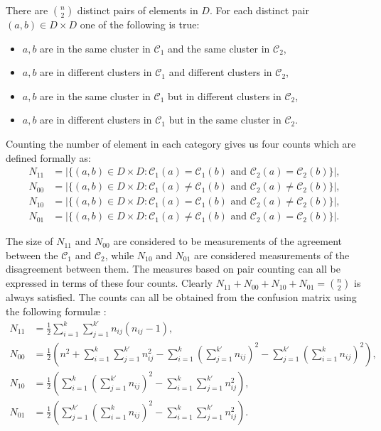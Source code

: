 \documentclass[a4paper]{report}
\newcommand{\dset}{D}
\newcommand{\clus}{\mathcal{C}}
\begin{document}
There are $\binom{n}{2}$ distinct pairs of elements in $\dset$.  For each
distinct pair $(a,b) \in \dset \times \dset$ one of the following is true:
\begin{itemize}
\item $a,b$ are in the same cluster in $\clus_1$ and the same cluster in
  $\clus_2$,
\item $a,b$ are in different clusters in $\clus_1$ and different clusters in
  $\clus_2$,
\item $a,b$ are in the same cluster in $\clus_1$ but in different clusters in
  $\clus_2$,
\item $a,b$ are in different clusters in $\clus_1$ but in the same cluster in
  $\clus_2$.
\end{itemize}

Counting the number of element in each category gives us four counts which are
defined formally as:
\begin{align*}
  N_{11} &= |\{(a,b) \in \dset \times \dset \colon
              \clus_1(a)=\clus_1(b) \text{ and } \clus_2(a)=\clus_2(b)
            \}|, \\
  N_{00} &= |\{(a,b) \in \dset \times \dset \colon
              \clus_1(a)\neq\clus_1(b) \text{ and } \clus_2(a)\neq\clus_2(b)
            \}|, \\
  N_{10} &= |\{(a,b) \in \dset \times \dset \colon
              \clus_1(a)=\clus_1(b) \text{ and } \clus_2(a)\neq\clus_2(b)
            \}|, \\
  N_{01} &= |\{(a,b) \in \dset \times \dset \colon
              \clus_1(a)\neq\clus_1(b) \text{ and } \clus_2(a)=\clus_2(b)
            \}|.
\end{align*}

The size of $N_{11}$ and $N_{00}$ are considered to be measurements of the
agreement between the $\clus_1$ and $\clus_2$, while $N_{10}$ and $N_{01}$ are
considered measurements of the disagreement between them.  The measures based
on pair counting can all be expressed in terms of these four counts.  Clearly
$N_{11}+N_{00}+N_{10}+N_{01} = \binom{n}{2}$ is always satisfied.  The counts
can all be obtained from the confusion matrix using the following formul\ae
\citep{hubert-arabie-1985}:
\begin{align*}
  N_{11} &= \frac{1}{2} \sum_{i=1}^{k} \sum_{j=1}^{k'} n_{ij}(n_{ij}-1),\\
  N_{00} &= \frac{1}{2} \left(n^2 + \sum_{i=1}^{k} \sum_{j=1}^{k'} n_{ij}^2
                             - \sum_{i=1}^{k}
                                \left(\sum_{j=1}^{k'} n_{ij} \right)^2
                             - \sum_{j=1}^{k'}
                                \left(\sum_{i=1}^{k} n_{ij} \right)^2
                       \right),\\
  N_{10} &= \frac{1}{2} \left(\sum_{i=1}^{k}
                              \left(\sum_{j=1}^{k'} n_{ij} \right)^2
                             - \sum_{i=1}^{k} \sum_{j=1}^{k'} n_{ij}^2
                       \right),\\
  N_{01} &= \frac{1}{2} \left(\sum_{j=1}^{k'}
                              \left(\sum_{i=1}^{k} n_{ij} \right)^2
                             - \sum_{i=1}^{k} \sum_{j=1}^{k'} n_{ij}^2
                       \right).
\end{align*}
\end{document}
